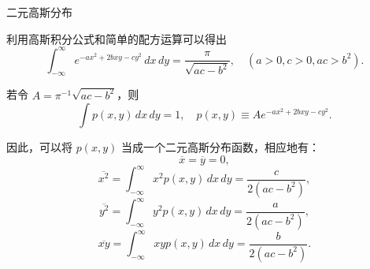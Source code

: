 \begin{defn}
    二元高斯分布

利用高斯积分公式和简单的配方运算可以得出
\[
\int_{-\infty}^{\infty} e^{-ax^2 + 2bxy - cy^2} \, dx \, dy = \frac{\pi}{\sqrt{ac - b^2}}, \quad (a > 0, c > 0, ac > b^2).
\]

若令 \( A = \pi^{-1} \sqrt{ac - b^2} \)，则
\[
\int p(x, y) \, dx \, dy = 1, \quad p(x, y) \equiv A e^{-ax^2 + 2bxy - cy^2}.
\]

因此，可以将 \( p(x, y) \) 当成一个二元高斯分布函数，相应地有：
\[
\overline{x} = \overline{y} = 0,
\]
\[
\overline{x^2} = \int_{-\infty}^{\infty} x^2 p(x, y) \, dx \, dy = \frac{c}{2(ac - b^2)},
\]
\[
\overline{y^2} = \int_{-\infty}^{\infty} y^2 p(x, y) \, dx \, dy = \frac{a}{2(ac - b^2)},
\]
\[
\overline{xy} = \int_{-\infty}^{\infty} xy p(x, y) \, dx \, dy = \frac{b}{2(ac - b^2)}.
\]
\end{defn}
